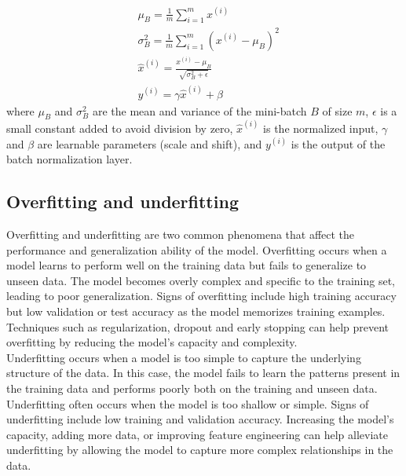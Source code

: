\begin{equation}
\begin{aligned}
& \mu_B=\frac{1}{m} \sum_{i=1}^m x^{(i)} \\
& \sigma_B^2=\frac{1}{m} \sum_{i=1}^m\left(x^{(i)}-\mu_B\right)^2 \\
& \hat{x}^{(i)}=\frac{x^{(i)}-\mu_B}{\sqrt{\sigma_B^2+\epsilon}} \\
& y^{(i)}=\gamma \hat{x}^{(i)}+\beta
\end{aligned}
\end{equation}
where $\mu_B$ and $\sigma_B^2$ are the mean and variance of the mini-batch $B$ of size $m$, $\epsilon$ is a small constant added to avoid division by zero, $\hat{x}^{(i)}$ is the normalized input, $\gamma$ and $\beta$ are learnable parameters (scale and shift), and $y^{(i)}$ is the output of the batch normalization layer.
\subsection{Overfitting and underfitting}
Overfitting and underfitting are two common phenomena that affect the performance and generalization ability of the model. Overfitting occurs when a model learns to perform well on the training data but fails to generalize to unseen data. The model becomes overly complex and specific to the training set, leading to poor generalization. Signs of overfitting include high training accuracy but low validation or test accuracy as the model memorizes training examples. Techniques such as regularization, dropout and early stopping can help prevent overfitting by reducing the model's capacity and complexity. \\
Underfitting occurs when a model is too simple to capture the underlying structure of the data. In this case, the model fails to learn the patterns present in the training data and performs poorly both on the training and unseen data. Underfitting often occurs when the model is too shallow or simple. Signs of underfitting include low training and validation accuracy. Increasing the model's capacity, adding more data, or improving feature engineering can help alleviate underfitting by allowing the model to capture more complex relationships in the data.
